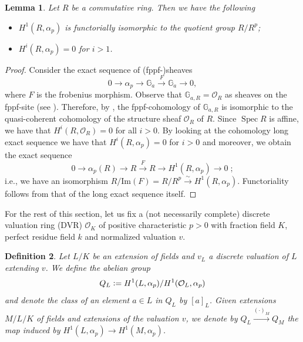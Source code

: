 \documentclass[a4paper,english,12pt]{amsart}
\newtheorem{definition}{Definition}[section]
\newtheorem{lemma}[definition]{Lemma}
\numberwithin{equation}{section}
\newcommand{\defeq}{\vcentcolon=}
\DeclareMathOperator{\Spec}{Spec}
\renewcommand{\_}{\rule{0.25cm}{0.4pt}}
\begin{document}
\begin{lemma}\label{H1=R/R^{p}}
    Let $R$ be a commutative ring. Then we have the following
    \begin{itemize}
        \item $H^{1}(R,\alpha_{p})$ is functorially isomorphic to the quotient group $R/R^{p}$;
        \item $H^{i}(R,\alpha_{p})=0$ for $i>1$.
    \end{itemize}
\end{lemma}
\begin{proof}
    Consider the exact sequence of (fppf-)sheaves
    \[
    0\rightarrow \alpha_{p}\rightarrow \mathbb{G}_{a}\xrightarrow{F} \mathbb{G}_{a}\rightarrow 0,
    \]
    where $F$ is the frobenius morphism. Observe that $\mathbb{G}_{a,R}=\mathcal{O}_{R}$ as sheaves on the fppf-site (see \cite[\href{https://stacks.math.columbia.edu/tag/03OG}{Tag 03OG}]{stacks-project}). Therefore, by \cite[\href{https://stacks.math.columbia.edu/tag/03P2}{Tag 03P2}]{stacks-project}, the fppf-cohomology of $\mathbb{G}_{a,R}$ is isomorphic to the quasi-coherent cohomology of the structure sheaf $\mathcal{O}_{R}$ of $R$. Since $\Spec R$ is affine, we have that $H^{i}(R, \mathcal{O}_{R})=0$ for all $i>0$.
    By looking at the cohomology long exact sequence we have that $H^{i}(R,\alpha_{p})=0$ for $i>0$ and moreover, we obtain the exact sequence
    \[
    0\to \alpha_{p}(R)\to R\xrightarrow{F} R\to H^{1}(R,\alpha_{p})\to 0\;;
    \]
    i.e., we have an isomorphism $R/\text{Im}(F)=R/R^{p}\xrightarrow{\sim} H^{1}(R,\alpha_{p})$. Functoriality follows from that of the long exact sequence itself.
\end{proof}

For the rest of this section, let us fix a (not necessarily complete) discrete valuation ring (DVR) $\mathcal{O}_{K}$ of positive characteristic $p>0$ with fraction field $K$, perfect residue field $k$ and normalized valuation $v$.

\begin{definition}
    Let $L/K$ be an extension of fields and $v_{L}$ a discrete valuation of $L$ extending $v$. We define the abelian group
    \[
    Q_{L}\defeq H^{1}(L,\alpha_{p})/H^{1}(\mathcal{O}_{L},\alpha_{p})
    \]
    and denote the class of an element $a\in L$ in $Q_{L}$ by $[a]_{L}$. Given extensions $M/L/K$ of fields and extensions of the valuation $v$, we denote by $Q_{L}\xrightarrow{(\cdot)_{M}} Q_{M}$ the map induced by $H^{1}(L,\alpha_{p})\to H^{1}(M,\alpha_{p})$.
\end{definition}
\end{document}
